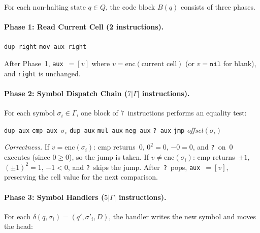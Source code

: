 For each non-halting state $q \in Q$, the code block $B(q)$ consists of three phases.

\paragraph{Phase 1: Read Current Cell (2 instructions).}

\begin{algorithmic}
\State \texttt{dup right} 
\State \texttt{mov aux right} 
\end{algorithmic}

After Phase~1, \texttt{aux}~$= [v]$ where $v = \mathrm{enc}(\text{current cell})$ (or $v = \texttt{nil}$ for blank), and \texttt{right} is unchanged.

\paragraph{Phase 2: Symbol Dispatch Chain ($7|\Gamma|$ instructions).}
For each symbol $\sigma_i \in \Gamma$, one block of 7~instructions performs an equality test:

\begin{algorithmic}
\State \texttt{dup aux} 
\State \texttt{cmp aux $\sigma_i$} 
\State \texttt{dup aux} 
\State \texttt{mul aux} 
\State \texttt{neg aux} 
\State \texttt{? aux} 
\State \texttt{jmp} \textit{offset}$(\sigma_i)$ 
\end{algorithmic}

\noindent
\textit{Correctness.} If $v = \mathrm{enc}(\sigma_i)$: cmp returns~0, $0^2 = 0$, $-0 = 0$, and \texttt{?}~on~0 executes (since $0 \geq 0$), so the jump is taken.
If $v \neq \mathrm{enc}(\sigma_i)$: cmp returns~$\pm 1$, $(\pm 1)^2 = 1$, $-1 < 0$, and \texttt{?}~skips the jump.
After~\texttt{?}~pops, \texttt{aux}~$= [v]$, preserving the cell value for the next comparison.

\paragraph{Phase 3: Symbol Handlers ($5|\Gamma|$ instructions).}
For each $\delta(q, \sigma_i) = (q', \sigma'_i, D)$, the handler writes the new symbol and moves the head:

